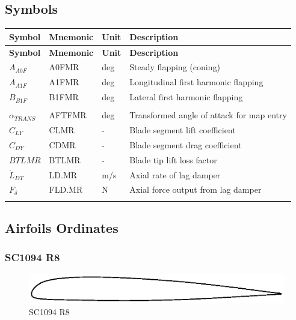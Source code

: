 \clearpage
\subsection{Symbols}

\begin{tabularx}{\textwidth}{ L l l l }
  \hline
  \textbf{Symbol} & \textbf{Mnemonic} & \textbf{Unit} & \textbf{Description} \\ \hline
  \endfirsthead
  \hline
  \textbf{Symbol} & \textbf{Mnemonic} & \textbf{Unit} & \textbf{Description} \\ \hline
  \endhead
  $A_{A0F}$ & A0FMR & deg & Steady flapping (coning) \\
  $A_{A1F}$ & A1FMR & deg & Longitudinal first harmonic flapping \\
  $B_{B1F}$ & B1FMR & deg & Lateral first harmonic flapping \\
  & & & \\
  ${\alpha}_{TRANS}$ & AFTFMR & deg & Transformed angle of attack for map entry \\
  $C_{LY}$           & CLMR   & -   & Blade segment lift coefficient \\
  $C_{DY}$           & CDMR   & -   & Blade segment drag coefficient \\
  $BTLMR$            & BTLMR  & -   & Blade tip lift loss factor \\
  ${\dot L}_{DT}$    & LD.MR  & m/s & Axial rate of lag damper \\
  $F_{\delta}$       & FLD.MR & N   & Axial force output from lag damper \\
  \caption{Main rotor symbols}
\end{tabularx}


\clearpage
\subsection{Airfoils Ordinates}

\subsubsection{SC1094 R8}

\begin{figure}[h!]
  \centering
  \includegraphics[width=127mm]{eps/airfoil_SC1094R8.eps}
  \caption{SC1094 R8}
\end{figure}

